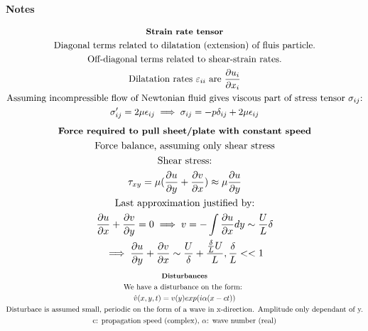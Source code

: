 \documentclass[10pt, a4paper]{article}
\newcommand{\derivative}[2]{\frac{\partial #1}{\partial #2}}
\begin{document}
\begin{center}
    \Large
    \textbf{Notes}
    \vspace{0.5cm}
\end{center}
\begin{gather*}
    \textbf{\small Strain rate tensor} \\
    \text{Diagonal terms related to dilatation (extension) of fluis particle.} \\
    \text{Off-diagonal terms related to shear-strain rates.} \\
    \text{Dilatation rates $\varepsilon_{ii}$ are $\derivative{ u_i}{x_i}$}\\
    \text{Assuming incompressible flow of Newtonian fluid gives viscous part of stress tensor $\sigma_{ij}$:} \\
    \sigma_{ij}' = 2\mu\epsilon_{ij} \implies \sigma_{ij} = -p\delta_{ij} + 2\mu\epsilon_{ij}
\end{gather*}
\begin{gather*}
    \textbf{\small Force required to pull sheet/plate with constant speed} \\
    \text{Force balance, assuming only shear stress} \\
    \text{Shear stress:} \\
    \tau_{xy} = \mu(\derivative{u}{y} + \derivative{v}{x}) \approx \mu\derivative{u}{y} \\
    \text{Last approximation justified by:} \\
    \derivative{u}{x} + \derivative{v}{y} = 0 \implies v = -\int\derivative{u}{x}dy \sim \frac{U}{L}\delta \\
    \implies \derivative{u}{y} + \derivative{v}{x} \sim \frac{U}{\delta} + \frac{\frac{\delta}{L}U}{L}, \frac{\delta}{L} << 1 
\end{gather*}
\begin{gather*}
    \textbf{\small Disturbances} \\
    \text{We have a disturbance on the form: } \\
    \hat{v}(x,y,t) = v(y)exp(i\alpha(x - ct)) \\
    \text{Disturbace is assumed small, periodic on the form of a wave in x-direction. Amplitude only dependant of y.} \\
    \text{c: propagation speed (complex), $\alpha$: wave number (real)}
\end{gather*}
\end{document}
